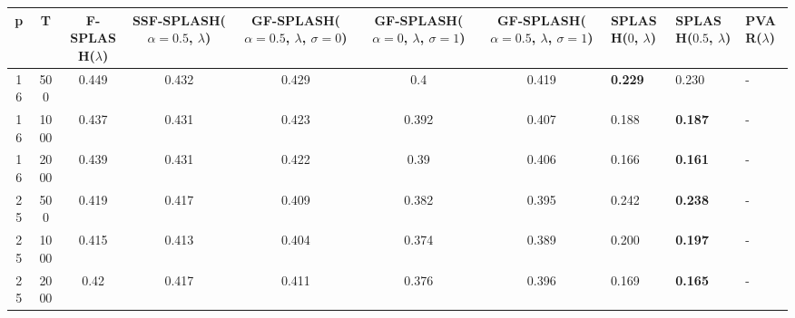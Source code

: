 \begin{tabular}{ccccccclll}
\hline
  p  &  T   &  F-SPLASH($\lambda$)  &  SSF-SPLASH($\alpha=0.5$, $\lambda$)  &  GF-SPLASH($\alpha=0.5$, $\lambda$, $\sigma=0$)  &  GF-SPLASH($\alpha=0$, $\lambda$, $\sigma=1$)  &  GF-SPLASH($\alpha=0.5$, $\lambda$, $\sigma=1$)  & SPLASH($0$, $\lambda$)   & SPLASH($0.5$, $\lambda$)   & PVAR($\lambda$)   \\
\hline
 16  & 500  &         0.449         &                 0.432                 &                      0.429                       &                      0.4                       &                      0.419                       & \textbf{0.229}           & 0.230                      & -                 \\
 16  & 1000 &         0.437         &                 0.431                 &                      0.423                       &                     0.392                      &                      0.407                       & 0.188                    & \textbf{0.187}             & -                 \\
 16  & 2000 &         0.439         &                 0.431                 &                      0.422                       &                      0.39                      &                      0.406                       & 0.166                    & \textbf{0.161}             & -                 \\
 25  & 500  &         0.419         &                 0.417                 &                      0.409                       &                     0.382                      &                      0.395                       & 0.242                    & \textbf{0.238}             & -                 \\
 25  & 1000 &         0.415         &                 0.413                 &                      0.404                       &                     0.374                      &                      0.389                       & 0.200                    & \textbf{0.197}             & -                 \\
 25  & 2000 &         0.42          &                 0.417                 &                      0.411                       &                     0.376                      &                      0.396                       & 0.169                    & \textbf{0.165}             & -                 \\
\hline
\end{tabular}